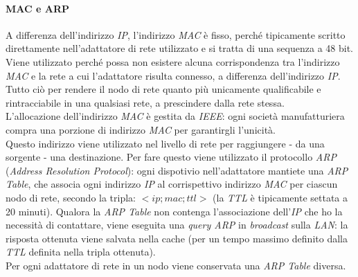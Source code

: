 \paragraph{MAC e ARP}
A differenza dell'indirizzo \textit{IP}, l'indirizzo \textit{MAC} è fisso, perché tipicamente scritto direttamente nell'adattatore di rete utilizzato e si tratta di una sequenza a 48 bit. Viene utilizzato perché possa non esistere alcuna corrispondenza tra l'indirizzo \textit{MAC} e la rete a cui l'adattatore risulta connesso, a differenza dell'indirizzo \textit{IP}. Tutto ciò per rendere il nodo di rete quanto più unicamente qualificabile e rintracciabile in una qualsiasi rete, a prescindere dalla rete stessa. \\
L'allocazione dell'indirizzo \textit{MAC} è gestita da \textit{IEEE}: ogni società manufatturiera compra una porzione di indirizzo \textit{MAC} per garantirgli l'unicità. \\
Questo indirizzo viene utilizzato nel livello di rete per raggiungere - da una sorgente - una destinazione. Per fare questo viene utilizzato il protocollo \textit{ARP} (\textit{Address Resolution Protocol}): ogni dispotivio nell'adattatore mantiete una \textit{ARP Table}, che associa ogni indirizzo \textit{IP} al corrispettivo indirizzo \textit{MAC} per ciascun nodo di rete, secondo la tripla: $<ip;mac;ttl>$ (la \textit{TTL} è tipicamente settata a 20 minuti). Qualora la \textit{ARP Table} non contenga l'associazione dell'\textit{IP} che ho la necessità di contattare, viene eseguita una \textit{query ARP} in \textit{broadcast} sulla \textit{LAN}: la risposta ottenuta viene salvata nella cache (per un tempo massimo definito dalla \textit{TTL} definita nella tripla ottenuta). \\
Per ogni adattatore di rete in un nodo viene conservata una \textit{ARP Table} diversa.

